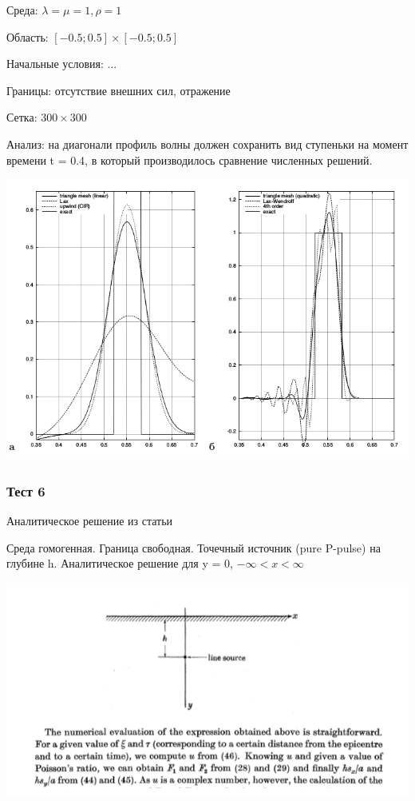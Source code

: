 \documentclass{article}
\begin{document}
Среда: $\lambda = \mu = 1, \rho = 1$

Область: $[-0.5; 0.5]\times[-0.5; 0.5]$

Начальные условия:
...

Границы: отсутствие внешних сил, отражение

Сетка: $300\times300$

Анализ: на диагонали профиль волны должен сохранить вид ступеньки на момент времени t = 0.4, в который производилось сравнение численных решений. 

\includegraphics[scale=0.35]{2D_seismic_tests/6.png}

\newpage
\subsubsection{Тест 6}

Аналитическое решение из статьи \cite{garvin}

Среда гомогенная. Граница свободная. Точечный источник (pure P-pulse) на глубине h. Аналитическое решение для y = 0, $-\infty < x < \infty$

\includegraphics[scale=0.5]{2D_seismic_tests/7.png}
\end{document}
